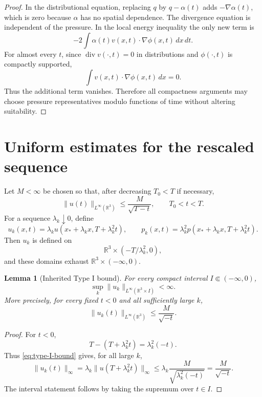 \documentclass[11pt]{amsart}
\theoremstyle{plain}
\newtheorem{lemma}[theorem]{Lemma}
\theoremstyle{definition}
\theoremstyle{remark}
\numberwithin{equation}{section}
\newcommand{\R}{\mathbb R}
\begin{document}
\begin{proof}
In the distributional equation, replacing \(q\) by \(q-\alpha(t)\) adds
\(-\nabla\alpha(t)\), which is zero because \(\alpha\) has no spatial
dependence.  The divergence equation is independent of the pressure.  In the
local energy inequality the only new term is
\[
   -2\int \alpha(t)v(x,t)\cdot\nabla\phi(x,t)\,dx\,dt .
\]
For almost every \(t\), since \(\operatorname{div}v(\cdot,t)=0\) in
distributions and \(\phi(\cdot,t)\) is compactly supported,
\[
   \int v(x,t)\cdot\nabla\phi(x,t)\,dx=0 .
\]
Thus the additional term vanishes.  Therefore all compactness arguments may
choose pressure representatives modulo functions of time without altering
suitability.
\end{proof}

\section{Uniform estimates for the rescaled sequence}\label{sec:bounds}

Let \(M<\infty\) be chosen so that, after decreasing \(T_0<T\) if necessary,
\begin{equation}\label{eq:type-I-bound}
   \|u(t)\|_{L^\infty(\R^3)}
   \le \frac{M}{\sqrt{T-t}},
   \qquad T_0<t<T.
\end{equation}
For a sequence \(\lambda_k\downarrow0\), define
\begin{equation}\label{eq:rescaled-sequence}
   u_k(x,t)=\lambda_k u(x_*+\lambda_k x,T+\lambda_k^2t),
   \qquad
   p_k(x,t)=\lambda_k^2p(x_*+\lambda_k x,T+\lambda_k^2t).
\end{equation}
Then \(u_k\) is defined on
\[
   \R^3\times(-T/\lambda_k^2,0),
\]
and these domains exhaust \(\R^3\times(-\infty,0)\).

\begin{lemma}[Inherited Type I bound]\label{lem:inherited-bound}
For every compact interval \(I\Subset(-\infty,0)\),
\[
   \sup_k\|u_k\|_{L^\infty(\R^3\times I)}<\infty.
\]
More precisely, for every fixed \(t<0\) and all sufficiently large \(k\),
\[
   \|u_k(t)\|_{L^\infty(\R^3)}
   \le \frac{M}{\sqrt{-t}}.
\]
\end{lemma}

\begin{proof}
For \(t<0\),
\[
   T-(T+\lambda_k^2t)=\lambda_k^2(-t).
\]
Thus \eqref{eq:type-I-bound} gives, for all large \(k\),
\[
   \|u_k(t)\|_\infty
   =
   \lambda_k \|u(T+\lambda_k^2t)\|_\infty
   \le
   \lambda_k\frac{M}{\sqrt{\lambda_k^2(-t)}}
   =
   \frac{M}{\sqrt{-t}}.
\]
The interval statement follows by taking the supremum over \(t\in I\).
\end{proof}
\end{document}
